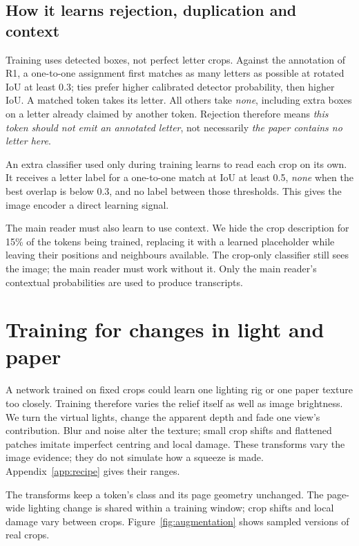 \documentclass[11pt]{article}
\newcommand{\Rone}{\textsf{R1}}
\newcommand{\none}{\textit{none}}
\begin{document}
\subsection{How it learns rejection, duplication and context}
Training uses detected boxes, not perfect letter crops. Against the annotation of \Rone{}, a one-to-one
assignment first matches as many letters as possible at rotated IoU at least 0.3; ties prefer higher
calibrated detector probability, then higher IoU. A matched token takes its letter. All others take
\none{}, including extra boxes on a letter already claimed by another token. Rejection therefore means
\emph{this token should not emit an annotated letter}, not necessarily \emph{the paper contains no letter here}.

An extra classifier used only during training learns to read each crop on its own. It receives a letter
label for a one-to-one match at IoU at least 0.5, \none{} when the best overlap is below 0.3, and no label
between those thresholds. This gives the image encoder a direct learning signal.

The main reader must also learn to use context. We hide the crop description for 15\% of the tokens
being trained, replacing it with a learned placeholder while leaving their positions and neighbours
available. The crop-only classifier still sees the image; the main reader must work without it.
Only the main reader's contextual probabilities are used to produce transcripts.

\section{Training for changes in light and paper}
\label{sec:training}
A network trained on fixed crops could learn one lighting rig or one paper texture too closely. Training
therefore varies the relief itself as well as image brightness. We turn the virtual lights, change the
apparent depth and fade one view's contribution. Blur and noise alter the texture; small crop shifts and
flattened patches imitate imperfect centring and local damage. These transforms vary the image evidence;
they do not simulate how a squeeze is made. Appendix~\ref{app:recipe} gives their ranges.

The transforms keep a token's class and its page geometry unchanged. The page-wide lighting change is
shared within a training window; crop shifts and local damage vary between crops. Figure~\ref{fig:augmentation}
shows sampled versions of real crops.
\end{document}
